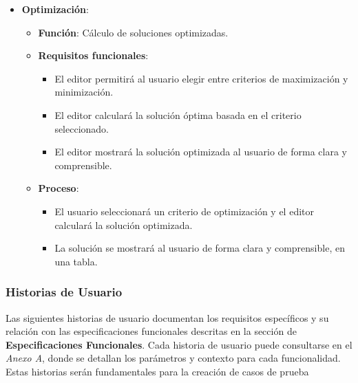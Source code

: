 \documentclass[stu, 12pt, letterpaper, donotrepeattitle, floatsintext, natbib]{apa7}
\begin{document}
\begin{itemize}
    \item \textbf{Optimización}:
    \begin{itemize}
        \item \textbf{Función}: Cálculo de soluciones optimizadas.
        \item \textbf{Requisitos funcionales}:
            \begin{itemize}
                \item El editor permitirá al usuario elegir entre criterios de maximización y minimización.
                \item El editor calculará la solución óptima basada en el criterio seleccionado.
                \item El editor mostrará la solución optimizada al usuario de forma clara y comprensible.
            \end{itemize}
        \item \textbf{Proceso}:
            \begin{itemize}
                \item El usuario seleccionará un criterio de optimización y el editor calculará la solución optimizada.
                \item La solución se mostrará al usuario de forma clara y comprensible, en una tabla.
            \end{itemize}
    \end{itemize}
\end{itemize}


\subsubsection{Historias de Usuario}

Las siguientes historias de usuario documentan los requisitos específicos y su relación con las especificaciones funcionales descritas en la sección de \textbf{Especificaciones Funcionales}. Cada historia de usuario puede consultarse en el \textit{Anexo A}, donde se detallan los parámetros y contexto para cada funcionalidad. Estas historias serán fundamentales para la creación de casos de prueba
\end{document}
